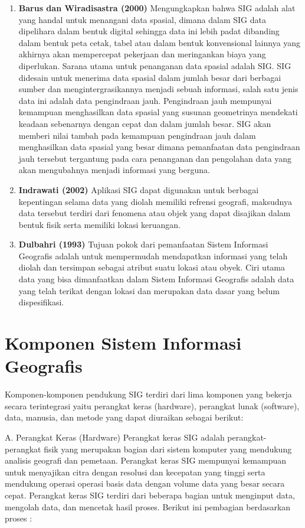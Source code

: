 \begin{enumerate}
\item \textbf{Barus dan Wiradisastra (2000)} 
\subitem Mengungkapkan bahwa SIG adalah alat yang handal untuk menangani data spasial, dimana dalam SIG data dipelihara dalam bentuk digital sehingga data ini lebih padat dibanding dalam bentuk peta cetak, tabel atau dalam bentuk konvensional lainnya yang akhirnya akan mempercepat pekerjaan dan meringankan biaya yang diperlukan.
Sarana utama untuk penanganan data spasial adalah SIG. SIG didesain untuk menerima data spasial dalam jumlah besar dari berbagai sumber dan mengintergrasikannya menjadi sebuah informasi, salah satu jenis data ini adalah data pengindraan jauh. Pengindraan jauh mempunyai kemampuan menghasilkan data spasial yang susunan geometrinya mendekati keadaan sebenarnya dengan cepat dan dalam jumlah besar. 
SIG akan memberi nilai tambah pada kemampuan pengindraan jauh dalam menghasilkan data spasial yang besar dimana pemanfaatan data pengindraan jauh tersebut tergantung pada cara penanganan dan pengolahan data yang akan mengubahnya menjadi informasi yang berguna.

\item \textbf{Indrawati (2002)}
\subitem Aplikasi SIG dapat digunakan untuk berbagai kepentingan selama data yang diolah memiliki refrensi geografi, maksudnya data tersebut terdiri dari fenomena atau objek yang dapat disajikan dalam bentuk fisik serta memiliki lokasi keruangan.

\item \textbf{Dulbahri (1993)}
\subitem Tujuan pokok dari pemanfaatan Sistem Informasi Geografis adalah untuk mempermudah mendapatkan informasi yang telah diolah dan tersimpan sebagai atribut suatu lokasi atau obyek. Ciri utama data yang bisa dimanfaatkan dalam Sistem Informasi Geografis adalah data yang telah terikat dengan lokasi dan merupakan data dasar yang belum dispesifikasi.

\end{enumerate}

\section{Komponen Sistem Informasi Geografis}
Komponen-komponen pendukung SIG terdiri dari lima komponen yang bekerja secara terintegrasi yaitu perangkat keras (hardware), perangkat lunak (software), data, manusia, dan metode yang dapat diuraikan sebagai berikut:

A.   Perangkat Keras (Hardware)
 Perangkat keras SIG adalah perangkat-perangkat fisik yang merupakan bagian dari sistem komputer yang mendukung analisis geografi dan pemetaan. Perangkat keras SIG mempunyai kemampuan untuk menyajikan citra dengan resolusi dan kecepatan yang tinggi serta mendukung operasi operasi basis data dengan volume data yang besar secara cepat. Perangkat keras SIG terdiri dari beberapa bagian untuk menginput data, mengolah data, dan mencetak hasil proses. Berikut ini pembagian berdasarkan proses :

